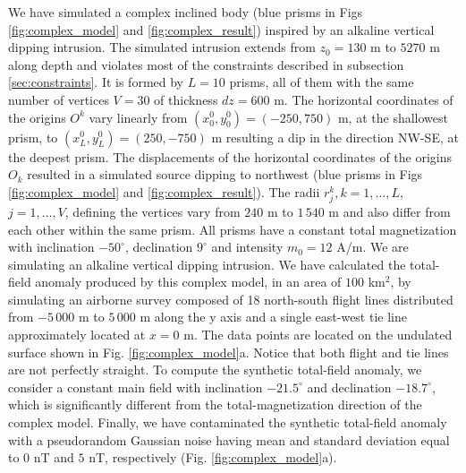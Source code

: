 We have simulated a complex inclined body (blue prisms in Figs \ref{fig:complex_model} and \ref{fig:complex_result}) inspired by an alkaline vertical dipping intrusion. The simulated intrusion extends from $z_0=130$ m to $5270$ m along depth and violates most of the constraints described in subsection \ref{sec:constraints}. It is formed by $ L = 10 $ prisms, all of them with the same number of vertices $ V = 30 $ of thickness $ dz = 600 $ m. The horizontal coordinates of the origins $ O^k $ vary linearly from $ (x_0^0, y_0^0) = (-250, 750) $ m, at the shallowest prism, to $ (x_L^0, y_L^0) = (250, -750) $ m resulting a dip in the direction NW-SE, at the deepest prism. The displacements of the horizontal coordinates of the origins $O_k$ resulted in a simulated source dipping to northwest (blue prisms in Figs \ref{fig:complex_model} and \ref{fig:complex_result}). The radii $ r^k_j, k = 1, \dots, L$, $j = 1,\dots, V$, defining the vertices vary from $ 240 $ m to $ 1\,540 $ m and also differ from each other within the same prism. All prisms have a constant total magnetization with inclination $ -50^\circ $, declination $ 9^\circ $ and intensity $ m_0 = 12 $ A/m. We are simulating an alkaline vertical dipping intrusion. We have calculated the total-field anomaly produced by this complex model, in an area of $ 100 $ km$^2 $, by simulating an airborne survey composed of 18 north-south flight lines distributed from $ -5\,000 $ m to $ 5\,000 $ m along the y axis and a single east-west tie line approximately located at $ x = 0 $ m. The data points are located on the undulated surface shown in Fig. \ref{fig:complex_model}a. Notice that both flight and tie lines are not perfectly straight. To compute the synthetic total-field anomaly, we consider a constant main field with inclination $ -21.5^\circ $ and declination $ -18.7^\circ $, which is significantly different from the total-magnetization direction of the complex model. Finally, we have
contaminated the synthetic total-field anomaly with a pseudorandom Gaussian noise having mean and standard deviation equal to $0$ nT and $5$ nT, respectively (Fig. \ref{fig:complex_model}a).

